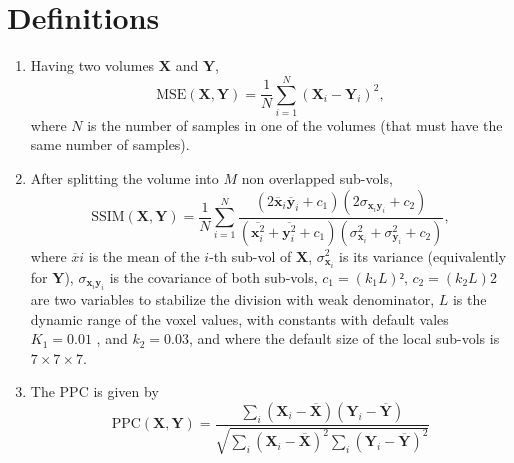 \documentclass{article}
\begin{document}
\section{Definitions}
\begin{enumerate}
  \item 
Having two volumes $\mathbf{X}$ and $\mathbf{Y}$,
\begin{equation}
  \text{MSE}(\mathbf{X},\mathbf{Y}) = \frac{1}{N}\sum_{i=1}^N(\mathbf{X}_i - \mathbf{Y}_i)^2,
\end{equation}
where $N$ is the number of samples in one of the volumes (that must
have the same number of samples).

\item
After splitting the volume into $M$ non overlapped sub-vols,
\begin{equation}
  \text{SSIM}(\mathbf{X}, \mathbf{Y}) = \frac{1}{N} \sum_{i=1}^N \frac{(2\overline{\mathbf{x}}_i \overline{\mathbf{y}}_i + c_1)(2\sigma_{\mathbf{x}_i \mathbf{y}_i} + c_2)}{(\overline{\mathbf{x}_i^2} + \overline{\mathbf{y}_i^2} + c_1)(\sigma^2_{\mathbf{x}_i} + \sigma^2_{\mathbf{y}_i} + c_2)},
\end{equation}
where $\overline{x}i$ is the mean of the $i$-th sub-vol of
$\mathbf{X}$, $\sigma^2_{\mathbf{x}_i}$ is its variance (equivalently
for $\mathbf{Y}$), $\sigma_{\mathbf{x}_i\mathbf{y}_i}$ is the
covariance of both sub-vols, $c_1=(k_1L) ²$, $c_2=(k_2L) 2$ are two
variables to stabilize the division with weak denominator, $L$ is the
dynamic range of the voxel values, with constants with default vales
$K_1=0.01$ , and $k_2=0.03$, and where the default size of the local
sub-vols is $7\times 7\times 7$.

\item
The PPC is given by
\begin{equation}
  \text{PPC}(\mathbf{X}, \mathbf{Y})  = \frac{\sum_i(\mathbf{X}_i - \overline{\mathbf{X}})(\mathbf{Y}_i - \overline{\mathbf{Y}})}{\sqrt{\sum_i (\mathbf{X}_i - \overline{\mathbf{X}})^2 \sum_i (\mathbf{Y}_i - \overline{\mathbf{Y}})^2}}
\end{equation}


\end{enumerate}
\end{document}
